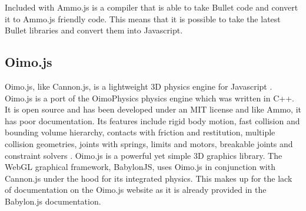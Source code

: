 Included with Ammo.js is a compiler that is able to take Bullet code and convert it to Ammo.js friendly code. This means that it is possible to take the latest Bullet libraries and convert them into Javascript.

\subsection{Oimo.js}
Oimo.js, like Cannon.js, is a lightweight 3D physics engine for Javascript \cite{r5}. Oimo.js is a port of the OimoPhysics physics engine which was written in C++. It is open source and has been developed under an MIT license and like Ammo, it has poor documentation.  Its features include rigid body motion, fast collision and bounding volume hierarchy, contacts with friction and restitution, multiple collision geometries, joints with springs, limits and motors, breakable joints and constraint solvers \cite{r5}. Oimo.js is a powerful yet simple 3D graphics library. The WebGL graphical framework, BabylonJS, uses Oimo.js in conjunction with Cannon.js under the hood for its integrated physics. This makes up for the lack of documentation on the Oimo.js website as it is already provided in the Babylon.js documentation.